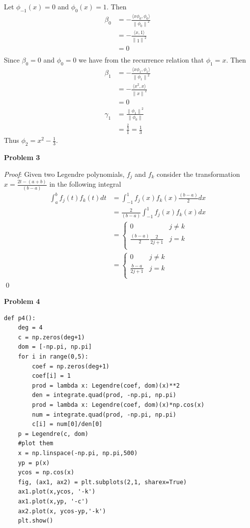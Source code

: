 \documentclass[12pt]{article}
\newcommand{\problem}[1]{\hspace{-4 ex} \large \textbf{Problem #1} }
\newcommand{\norm}[1]{\left\lVert#1\right\rVert}
\renewenvironment{proof}{\hspace{-4 ex} \emph{Proof}:}{\qed}
\begin{document}
	Let $\phi_{-1}(x) = 0$ and $\phi_0(x) = 1$. Then 
	\begin{align*}
		\beta_0 & = - \frac{\langle x \phi_0, \phi_0 \rangle}{\norm{\phi_0}^2} \\
		& = - \frac{\langle x, 1 \rangle}{\norm{1}^2} \\
		& = 0 \\
	\end{align*}
	Since $\beta_0 = 0$ and $\phi_0 = 0$ we have from the recurrence relation that $\phi_1 = x$. Then
	\begin{align*}
	\beta_1 & = - \frac{\langle x \phi_1, \phi_1 \rangle}{\norm{\phi_1}^2} \\
		& = - \frac{\langle x^2, x \rangle}{\norm{x}^2} \\
		& = 0 \\
		\gamma_1 & = \frac{\norm{\phi_1}^2}{ \norm{\phi_{0}}} \\
		& = \frac{\tfrac{2}{3}}{1} = \tfrac{1}{3}
	\end{align*}
	Thus $\phi_2 = x^2 - \tfrac{1}{3}$.
	
\problem{3} 

	\begin{proof}
		Given two Legendre polynomials, $f_j$ and $f_k$ consider the transformation $x=\frac{2t-(a+b)}{(b-a)}$ in the following integral
		\begin{align*}
			\int_a^b f_j(t)f_k(t) dt & = \int_{-1}^1f_j(x)f_k(x) \frac{(b-a)}{2} dx \\
			& = \frac{2}{(b-a)} \int_{-1}^1f_j(x)f_k(x) dx \\
			& = 
				\begin{cases} 
					0 & j \neq k\\
					\frac{(b-a)}{2} \frac{2}{2j+1} & j=k \\
				\end{cases}\\
			& = 
				\begin{cases} 
					0 & j \neq k\\
					\frac{b-a}{2j+1} & j=k \\
				\end{cases}
		\end{align*}
	\end{proof}

\problem{4} 

	\begin{lstlisting}
def p4():
	deg = 4
	c = np.zeros(deg+1)
	dom = [-np.pi, np.pi]
	for i in range(0,5):
		coef = np.zeros(deg+1)
		coef[i] = 1
		prod = lambda x: Legendre(coef, dom)(x)**2
		den = integrate.quad(prod, -np.pi, np.pi)
		prod = lambda x: Legendre(coef, dom)(x)*np.cos(x)
		num = integrate.quad(prod, -np.pi, np.pi)
		c[i] = num[0]/den[0]
	p = Legendre(c, dom)
	#plot them
	x = np.linspace(-np.pi, np.pi,500)
	yp = p(x)
	ycos = np.cos(x)
	fig, (ax1, ax2) = plt.subplots(2,1, sharex=True)
	ax1.plot(x,ycos, '-k')
	ax1.plot(x,yp, '-c')
	ax2.plot(x, ycos-yp,'-k')
	plt.show()
	\end{lstlisting}
	
\end{document}
